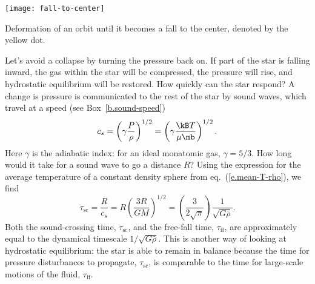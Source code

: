 \begin{marginfigure}
\texttt{[image: fall-to-center]}
\caption[Fall to center]{\label{f.fall-to-center} Deformation of an orbit until it becomes a fall to the center, denoted by the yellow dot.}
\end{marginfigure}

Let's avoid a collapse by turning the pressure back on.  If part of the star is falling inward, the gas within the star will be compressed, the pressure will rise, and hydrostatic equilibrium will be restored.  How quickly can the star respond? A change is pressure is communicated to the rest of the star by sound waves, which travel at a speed (see Box~\ref{b.sound-speed})
\begin{equation}\label{e.speed-of-sound}
c_{s} = \left(\gamma\frac{P}{\rho}\right)^{1/2}
	= \left(\gamma\frac{\kB T}{\mu\mb}\right)^{1/2}.
\end{equation}
Here $\gamma$ is the adiabatic index: for an ideal monatomic gas, $\gamma = 5/3$.  How long would it take for a sound wave to go a distance $R$?  Using the expression for the average temperature of a constant density sphere from eq.~(\ref{e.mean-T-rho}), we find
\[
	\tau_{\mathrm{sc}} = \frac{R}{c_{s}} = R\left(\frac{3R}{GM}\right)^{1/2}
		= \left(\frac{3}{2\sqrt{\pi}}\right)\frac{1}{\sqrt{G\bar{\rho}}}.
\]
Both the sound-crossing time, $\tau_{\mathrm{sc}}$, and the free-fall time, $\tau_{\mathrm{ff}}$, are approximately equal to the dynamical timescale $1/\sqrt{G\bar{\rho}}$.  This is another way of looking at hydrostatic equilibrium: the star is able to remain in balance because the time for pressure disturbances to propagate, $\tau_{\mathrm{sc}}$, is comparable to the time for large-scale motions of the fluid, $\tau_{\mathrm{ff}}$.


